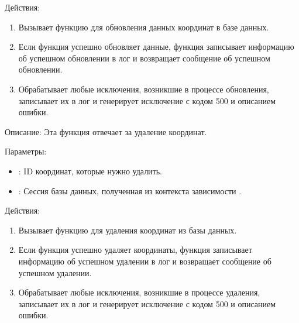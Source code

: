 \documentclass[letterpaper,10pt,russian]{sphinxmanual}
\begin{document}
\sphinxAtStartPar
Действия:
\begin{enumerate}
%
\item {} 
\sphinxAtStartPar
Вызывает функцию  для обновления данных координат в базе данных.

\item {} 
\sphinxAtStartPar
Если функция  успешно обновляет данные, функция записывает информацию об успешном обновлении в лог и возвращает сообщение об успешном обновлении.

\item {} 
\sphinxAtStartPar
Обрабатывает любые исключения, возникшие в процессе обновления, записывает их в лог и генерирует исключение  с кодом 500 и описанием ошибки.

\end{enumerate}

\sphinxAtStartPar
{}

\sphinxAtStartPar
Описание: Эта функция отвечает за удаление координат.

\sphinxAtStartPar
Параметры:
\begin{itemize}
\item {} 
\sphinxAtStartPar
{}: ID координат, которые нужно удалить.

\item {} 
\sphinxAtStartPar
{}: Сессия базы данных, полученная из контекста зависимости .

\end{itemize}

\sphinxAtStartPar
Действия:
\begin{enumerate}
%
\item {} 
\sphinxAtStartPar
Вызывает функцию  для удаления координат из базы данных.

\item {} 
\sphinxAtStartPar
Если функция  успешно удаляет координаты, функция записывает информацию об успешном удалении в лог и возвращает сообщение об успешном удалении.

\item {} 
\sphinxAtStartPar
Обрабатывает любые исключения, возникшие в процессе удаления, записывает их в лог и генерирует исключение  с кодом 500 и описанием ошибки.

\end{enumerate}
\end{document}
